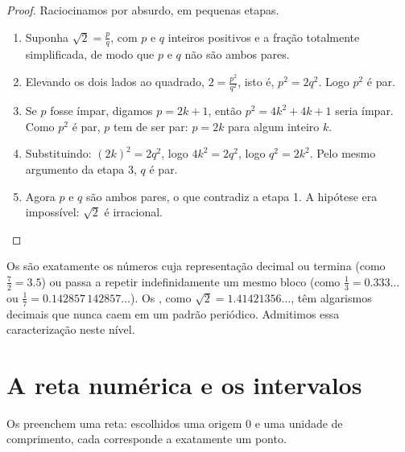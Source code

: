 \begin{proof}
Raciocinamos por absurdo, em pequenas etapas.
\begin{enumerate}
  \item Suponha $\sqrt 2 = \frac{p}{q}$, com $p$ e $q$ inteiros positivos
        e a fração totalmente simplificada, de modo que $p$ e $q$ não são
        ambos pares.
  \item Elevando os dois lados ao quadrado, $2 = \frac{p^2}{q^2}$, isto é,
        $p^2 = 2q^2$. Logo $p^2$ é par.
  \item Se $p$ fosse ímpar, digamos $p = 2k+1$, então
        $p^2 = 4k^2 + 4k + 1$ seria ímpar. Como $p^2$ é par, $p$ tem de
        ser par: $p = 2k$ para algum inteiro $k$.
  \item Substituindo: $(2k)^2 = 2q^2$, logo $4k^2 = 2q^2$, logo
        $q^2 = 2k^2$. Pelo mesmo argumento da etapa 3, $q$ é par.
  \item Agora $p$ e $q$ são ambos pares, o que contradiz a etapa 1. A
        hipótese era impossível: $\sqrt 2$ é irracional.
\end{enumerate}
\end{proof}

\begin{remark}
Os  são exatamente os números cuja representação decimal
ou termina (como $\frac72 = 3.5$) ou passa a repetir indefinidamente um
mesmo bloco (como $\frac13 = 0.333\dots$ ou
$\frac{1}{7} = 0.142857\,142857\dots$). Os , como
$\sqrt2 = 1.41421356\dots$, têm algarismos decimais que nunca caem em um
padrão periódico. Admitimos essa caracterização neste nível.
\end{remark}

\section{A reta numérica e os intervalos}

Os  preenchem uma reta: escolhidos uma origem $0$ e uma
unidade de comprimento, cada  corresponde a exatamente um
ponto.

